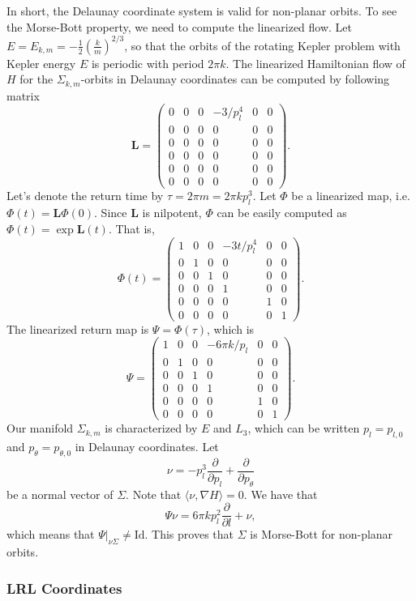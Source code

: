 \documentclass{amsart}
\newcommand{\Id}{\mathrm{Id}}
\newcommand{\pp}{\partial}
\begin{document}
In short, the Delaunay coordinate system is valid for non-planar orbits.
To see the Morse-Bott property, we need to compute the linearized flow.
Let $E=E_{k,m}=-\frac{1}{2}\left(\frac{k}{m}\right)^{2/3}$, so that the orbits of the rotating Kepler problem with Kepler energy $E$ is periodic with period $2\pi k$.
The linearized Hamiltonian flow of $H$ for the $\Sigma_{k,m}$-orbits in Delaunay coordinates can be computed by following matrix
$$
\mathbf{L}=\begin{pmatrix}
	0&0&0&-3/p_l^4&0&0\\
	0&0&0&0&0&0\\
	0&0&0&0&0&0\\
	0&0&0&0&0&0\\
	0&0&0&0&0&0\\
	0&0&0&0&0&0
\end{pmatrix}.
$$
Let's denote the return time by $\tau=2\pi m = 2\pi k p_l^3$.
Let $\Phi$ be a linearized map, i.e. $\Phi(t) = \mathbf{L}\Phi(0)$.
Since $\mathbf{L}$ is nilpotent, $\Phi$ can be easily computed as $\Phi(t) = \exp \mathbf{L}(t)$.
That is,
$$
\Phi (t) = \begin{pmatrix}
	1&0&0&-3t/p_l^4&0&0\\
	0&1&0&0&0&0\\
	0&0&1&0&0&0\\
	0&0&0&1&0&0\\
	0&0&0&0&1&0\\
	0&0&0&0&0&1
\end{pmatrix}.
$$
The linearized return map is $\Psi=\Phi(\tau)$, which is
$$
\Psi = \begin{pmatrix}
	1&0&0& -6\pi k / p_l & 0&0\\
	0&1&0&0&0&0\\
	0&0&1&0&0&0\\
	0&0&0&1&0&0\\
	0&0&0&0&1&0\\
	0&0&0&0&0&1
\end{pmatrix}.
$$
Our manifold $\Sigma_{k,m}$ is characterized by $E$ and $L_3$, which can be written $p_l=p_{l,0}$ and $p_\theta=p_{\theta,0}$ in Delaunay coordinates.
Let
$$
\nu = -p_l^3 \frac{\pp}{\pp p_l} + \frac{\pp}{\pp p_\theta}
$$
be a normal vector of $\Sigma$.
Note that $\langle \nu, \nabla H \rangle =0$.
We have that
$$
\Psi \nu = 6\pi k p_l^2 \frac{\pp}{\pp l} + \nu,
$$
which means that $\Psi|_{\nu \Sigma}\neq\Id$.
This proves that $\Sigma$ is Morse-Bott for non-planar orbits.

\subsubsection*{LRL Coordinates}
\end{document}
